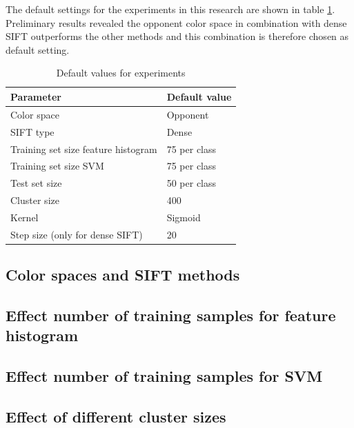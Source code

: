 The default settings for the experiments in this research are shown in table \ref{tab:default}. Preliminary results revealed the opponent color space in combination with dense SIFT outperforms the other methods and this combination is therefore chosen as default setting.

\begin{table}[H]
\begin{tabular}{|l|l|}
\hline
\textbf{Parameter} & \textbf{Default value}\\
\hline
Color space & Opponent\\
SIFT type & Dense\\
Training set size feature histogram & 75 per class\\
Training set size SVM & 75 per class\\
Test set size & 50 per class \\
Cluster size & 400 \\
Kernel & Sigmoid \\
Step size (only for dense SIFT) & 20\\
\hline
\end{tabular}
\caption{Default values for experiments}
\label{tab:default}
\end{table}

\subsection{Color spaces and SIFT methods}


\subsection{Effect number of training samples for feature histogram}




\subsection{Effect number of training samples for SVM}




\subsection{Effect of different cluster sizes}

